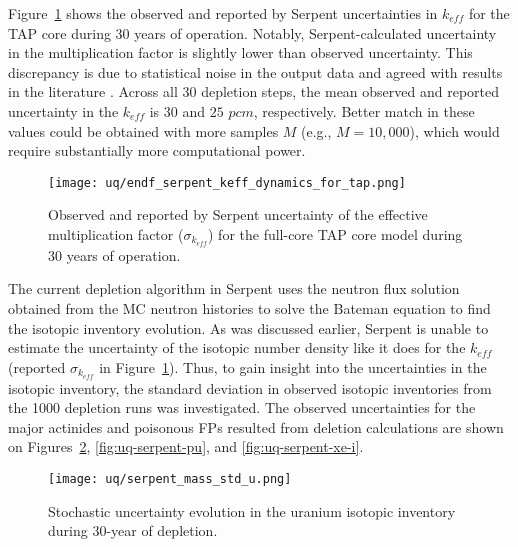 Figure~\ref{fig:uq-serpent-keff-evolution} shows the observed and reported by 
Serpent uncertainties in $k_{eff}$ for the \gls{TAP} core during 30 years of 
operation. Notably, Serpent-calculated uncertainty in the multiplication 
factor is slightly lower than observed uncertainty. This discrepancy is due to 
statistical noise in the output data and agreed with results in the literature 
\cite{wyant_numerical_2012}. Across all 30 depletion steps, the mean observed 
and reported uncertainty in the $k_{eff}$ is $30$ and $25$ $pcm$, 
respectively. Better match in these values could be obtained with more samples 
$M$ (e.g., $M=10,000$), which would require substantially more computational 
power.
\begin{figure}[hbp!] %
	\centering
	\texttt{[image: uq/endf\_serpent\_keff\_dynamics\_for\_tap.png]}
	\caption{Observed and reported by Serpent uncertainty of the effective 
	multiplication factor ($\sigma_{k_{eff}}$) for the full-core \gls{TAP} 
	core model during 30 years of operation.}
	\label{fig:uq-serpent-keff-evolution}
\end{figure}

The current depletion algorithm in Serpent uses the neutron flux solution 
obtained from the \gls{MC} neutron histories to solve the Bateman equation to 
find the isotopic inventory evolution. As was discussed earlier, Serpent 
is unable to estimate the uncertainty of the isotopic number density like it 
does for the $k_{eff}$ (reported $\sigma_{k_{eff}}$ in 
Figure~\ref{fig:uq-serpent-keff-evolution}). Thus, to gain insight into the 
uncertainties in the isotopic inventory, the standard deviation in observed 
isotopic inventories from the 1000 depletion runs was investigated. The 
observed uncertainties for the major actinides and poisonous \glspl{FP} 
resulted from deletion calculations are shown on  
Figures~\ref{fig:uq-serpent-u}, \ref{fig:uq-serpent-pu}, and 
\ref{fig:uq-serpent-xe-i}.

\begin{figure}[htp!] %
	\centering
	\texttt{[image: uq/serpent\_mass\_std\_u.png]}
		\vspace{-4mm}
	\caption{Stochastic uncertainty evolution in the uranium isotopic 
	inventory during 30-year of depletion.}
	\label{fig:uq-serpent-u}
\end{figure}

